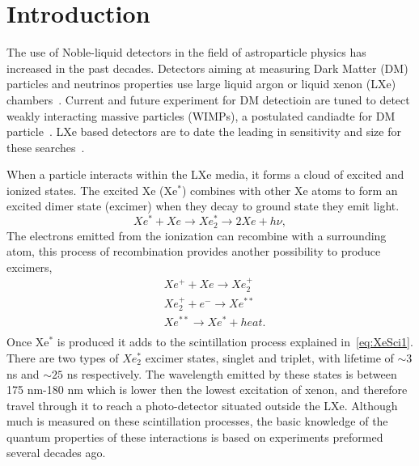 \section{Introduction}
\label{sec:Intro}

The use of Noble-liquid detectors in the field of astroparticle physics has increased in the past decades. Detectors aiming at measuring Dark Matter (DM) particles and neutrinos properties use large liquid argon or liquid xenon (LXe) chambers~\cite{Aprile:2009dv,Rubbia:2013tpa}. Current and future experiment for DM detectioin are tuned to detect weakly interacting massive particles (WIMPs), a postulated candiadte for DM particle~\cite{Bertone:2010zza}. LXe based detectors are to date the leading in sensitivity and size for these searches~\cite{Aprile:2017iyp,Akerib:2016vxi,Fu:2016ega,Aalbers:2016jon}. 

When a particle interacts within the LXe media, it forms a cloud of excited and ionized states. The excited Xe (Xe$^*$) combines with other Xe atoms to form an excited dimer state (excimer) when they decay to ground state they emit light. 
\begin{equation} \label{eq:XeSci1}
 Xe^*+Xe \rightarrow Xe^*_2 \rightarrow 2Xe + h \nu , 
\end{equation}
The electrons emitted from the ionization can recombine with a surrounding atom, this process of recombination provides another possibility to produce excimers,
\begin{equation} \label{eq:XeSci2}
\begin{split}
  &Xe^{+} + Xe \rightarrow Xe^{+}_2 \\
  &Xe^{+}_2 + e^{-}  \rightarrow Xe^{**} \\
  &Xe^{**}   \rightarrow Xe^* + heat .\\
  \end{split}
\end{equation}  
Once Xe$^*$ is produced it adds to the scintillation process explained in~\ref{eq:XeSci1}. There are two types of $Xe^*_2$ excimer states, singlet and triplet, with lifetime of $\sim3$ ns and $\sim25$ ns respectively. The wavelength emitted by these states is between 175 nm-180 nm which is lower then the lowest excitation of xenon, and therefore travel through it to reach a photo-detector situated outside the LXe. Although much is measured on these scintillation processes, the basic knowledge of the quantum properties of these interactions is based on experiments preformed several decades ago.

